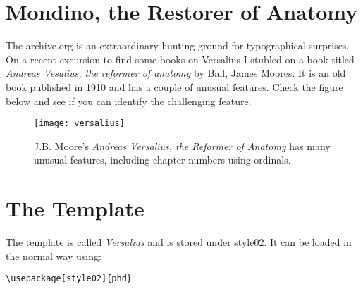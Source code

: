 \clearpage
\makeatletter\@debugtrue\makeatother
{}

\debugtitle
\debugchapter
\chapter[Template 2]{Mondino, the Restorer of Anatomy}

The archive.org is an extraordinary hunting ground  for typographical surprises. On a recent excursion to find some books on Versalius I stubled on a book titled \emph{Andreas Vesalius, the reformer of anatomy} by  Ball, James Moores. It is an old book published in 1910 and has a couple of unusual features. Check the figure below and see if you can identify the challenging feature.

\begin{figure}[ht]
\centering
\texttt{[image: versalius]}
\caption{J.B. Moore’s \emph{Andreas Versalius, the Reformer of Anatomy} has many unusual features, including chapter numbers using ordinals. }
\end{figure}

          
\chapter{The Template}          
The template is called \emph{Versalius} and is stored under style02. It can be loaded in the normal way using:
\begin{verbatim}
\usepackage[style02]{phd}
\end{verbatim}

